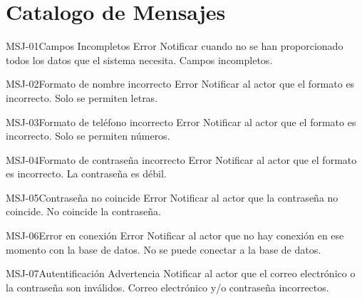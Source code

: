 \section{Catalogo de Mensajes}

	\begin{Message}{MSJ-01}{Campos Incompletos}
		\MSGitem[Tipo:] Error
		\MSGitem[Objetivo: ] Notificar cuando no se han proporcionado todos los datos que el sistema necesita.
		\MSGitem[Redacción: ] Campos incompletos.
	\end{Message}

	\begin{Message}{MSJ-02}{Formato de nombre incorrecto}
		\MSGitem[Tipo:] Error
		\MSGitem[Objetivo: ] Notificar al actor que el formato es incorrecto.
		\MSGitem[Redacción: ] Solo se permiten letras.
	\end{Message}

		\begin{Message}{MSJ-03}{Formato de teléfono incorrecto}
		\MSGitem[Tipo:] Error
		\MSGitem[Objetivo: ] Notificar al actor que el formato es incorrecto.
		\MSGitem[Redacción: ] Solo se permiten números.
	\end{Message}

	\begin{Message}{MSJ-04}{Formato de contraseña incorrecto}
		\MSGitem[Tipo:] Error
		\MSGitem[Objetivo: ] Notificar al actor que el formato es incorrecto.
		\MSGitem[Redacción: ] La contraseña es débil.
	\end{Message}

	\begin{Message}{MSJ-05}{Contraseña no coincide}
		\MSGitem[Tipo:] Error
		\MSGitem[Objetivo: ] Notificar al actor que la contraseña no coincide.
		\MSGitem[Redacción: ] No coincide la contraseña.
		\end{Message}

	\begin{Message}{MSJ-06}{Error en conexión}
		\MSGitem[Tipo:] Error
		\MSGitem[Objetivo: ] Notificar al actor que no hay conexión en ese momento con la base de datos.
		\MSGitem[Redacción: ] No se puede conectar a la base de datos.
	\end{Message}

	\begin{Message}{MSJ-07}{Autentificación}
		\MSGitem[Tipo:] Advertencia
		\MSGitem[Objetivo: ] Notificar al actor que el correo electrónico o la contraseña son inválidos.
		\MSGitem[Redacción: ] Correo electrónico y/o contraseña incorrectos.
	\end{Message}

